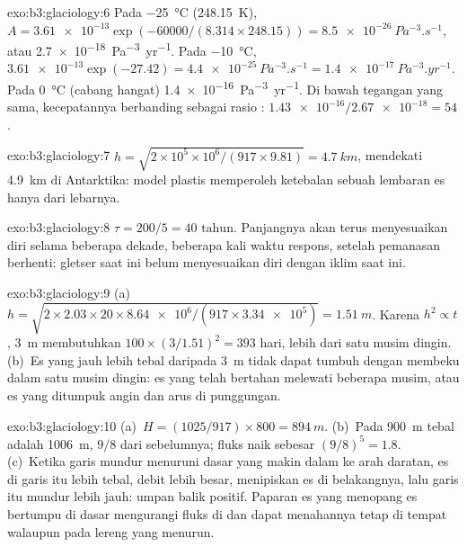 \begin{solution}{exo:b3:glaciology:6}
Pada \qty{-25}{\celsius} (\qty{248.15}{K}), $A = \num{3.61e-13}\exp(-60000/
(8.314\times248.15)) = \qty{8.5e-26}{Pa^{-3}.s^{-1}}$, atau
\qty{2.7e-18}{Pa^{-3}.yr^{-1}}. Pada \qty{-10}{\celsius}, $\num{3.61e-13}
\exp(-27.42) = \qty{4.4e-25}{Pa^{-3}.s^{-1}} = \qty{1.4e-17}{Pa^{-3}.yr^{-1}}$.
Pada \qty{0}{\celsius} (cabang hangat) \qty{1.4e-16}{Pa^{-3}.yr^{-1}}. Di bawah
tegangan yang sama, kecepatannya berbanding sebagai rasio :
$\num{1.43e-16}/\num{2.67e-18} = 54$.
\end{solution}

\begin{solution}{exo:b3:glaciology:7}
$h = \sqrt{2\times10^5\times10^6/(917\times9.81)} = \qty{4.7}{km}$, mendekati
\qty{4.9}{km} di Antarktika: model plastis memperoleh ketebalan sebuah
lembaran es hanya dari lebarnya.
\end{solution}

\begin{solution}{exo:b3:glaciology:8}
$\tau = 200/5 = \num{40}\text{ tahun}$. Panjangnya akan terus menyesuaikan diri selama
beberapa dekade, beberapa kali waktu respons, setelah pemanasan berhenti: gletser saat ini
belum menyesuaikan diri dengan iklim saat ini.
\end{solution}

\begin{solution}{exo:b3:glaciology:9}
(a)~$h = \sqrt{2\times2.03\times20\times\num{8.64e6}/(917\times\num{3.34e5})}
= \qty{1.51}{m}$. Karena $h^2 \propto t$, \qty{3}{m} membutuhkan $100\times
(3/1.51)^2 = 393$ hari, lebih dari satu musim dingin. (b)~Es yang jauh lebih tebal daripada
\qty{3}{m} tidak dapat tumbuh dengan membeku dalam satu musim dingin: es yang
telah bertahan melewati beberapa musim, atau es yang ditumpuk angin dan arus di punggungan.
\end{solution}

\begin{solution}{exo:b3:glaciology:10}
(a)~$H = (1025/917)\times800 = \qty{894}{m}$. (b)~Pada \qty{900}{m}
tebal  adalah \qty{1006}{m}, $9/8$ dari sebelumnya; fluks
naik sebesar $(9/8)^5 = 1.8$. (c)~Ketika garis mundur menuruni dasar yang makin dalam
ke arah daratan, es di garis itu lebih tebal, debit lebih besar, menipiskan es
di belakangnya, lalu garis itu mundur lebih jauh: umpan balik positif. Paparan es
yang menopang es bertumpu di dasar mengurangi fluks di  dan dapat
menahannya tetap di tempat walaupun pada lereng yang menurun.
\end{solution}

